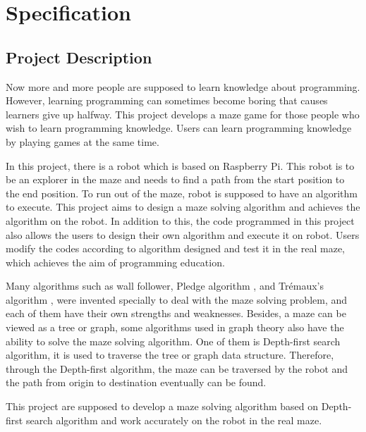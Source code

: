 \documentclass[11pt,times,oneside,openright,hardcopy]{eeereport}
\begin{document}

\mainmatter
{}

\chapter{Specification}\label{cpt:spec}

\section{Project Description}
Now more and more people are supposed to learn knowledge about programming. However, learning programming can sometimes become boring that causes learners give up halfway.
This project develops a maze game for those people who wish to learn programming knowledge. Users can learn programming knowledge by playing games at the same time.

In this project, there is a robot which is based on Raspberry Pi. This robot is to be an explorer in the maze and needs to find a path from the start position to the end position.
To run out of the maze, robot is supposed to have an algorithm to execute. This project aims to design a maze solving algorithm and achieves the algorithm on the robot.
In addition to this, the code programmed in this project also allows the users to design their own algorithm and execute it on robot. Users modify the codes according to algorithm designed and test it in the real maze, which achieves the aim of programming education.

Many algorithms such as wall follower, Pledge algorithm \cite{Klein:2011hi}, and Trémaux's algorithm \cite{Anonymous:2007ch}, were invented specially to deal with the maze solving problem, and each of them have their own strengths and weaknesses.
Besides, a maze can be viewed as a tree or graph, some algorithms used in graph theory also have the ability to solve the maze solving algorithm. One of them is Depth-first search algorithm, it is used to traverse the tree or graph data structure. Therefore, through the Depth-first algorithm, the maze can be traversed by the robot and the path from origin to destination eventually can be found.

This project are supposed to develop a maze solving algorithm based on Depth-first search algorithm and work accurately on the robot in the real maze.
\end{document}
